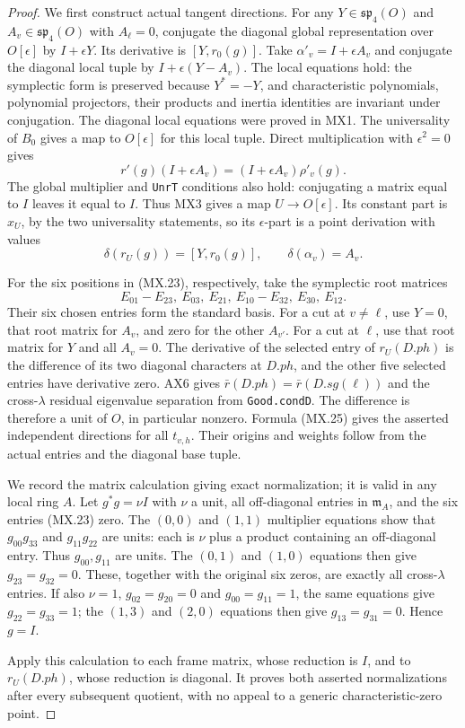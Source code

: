 \begin{proof}
We first construct actual tangent directions.
For any $Y\in\mathfrak {sp}_4(O)$ and
$A_v\in\mathfrak {sp}_4(O)$ with $A_\ell=0$, conjugate
the diagonal global representation over $O[\epsilon]$
by $I+\epsilon Y$.  Its derivative is $[Y,r_0(g)]$.
Take $\alpha'_v=I+\epsilon A_v$ and conjugate the
diagonal local tuple by $I+\epsilon(Y-A_v)$.
The local equations hold: the symplectic form is preserved
because $Y^*=-Y$, and characteristic polynomials,
polynomial projectors, their products and inertia identities
are invariant under conjugation.  The diagonal local
equations were proved in MX1.
The universality of $B_0$ gives a map to $O[\epsilon]$
for this local tuple.  Direct multiplication with
$\epsilon^2=0$ gives
\[
 r'(g)(I+\epsilon A_v)
  =(I+\epsilon A_v)\rho'_v(g).
 \tag{MX.24}
\]
The global multiplier and \texttt{UnrT} conditions also
hold: conjugating a matrix equal to $I$ leaves it equal
to $I$.  Thus MX3 gives a map $U\to O[\epsilon]$.
Its constant part is $x_U$, by the two universality
statements, so its $\epsilon$-part is a point derivation
with values
\[
 \delta(r_U(g))=[Y,r_0(g)],\qquad
                         \delta(\alpha_v)=A_v.
 \tag{MX.25}
\]

For the six positions in (MX.23), respectively, take the
symplectic root matrices
\[
 E_{01}-E_{23},\ E_{03},\ E_{21},\
 E_{10}-E_{32},\ E_{30},\ E_{12}.
 \tag{MX.26}
\]
Their six chosen entries form the standard basis.
For a cut at $v\ne\ell$, use $Y=0$, that root matrix
for $A_v$, and zero for the other $A_{v'}$.
For a cut at $\ell$, use that root matrix for $Y$ and
all $A_v=0$.
The derivative of the selected entry of $r_U(D.ph)$ is
the difference of its two diagonal characters at $D.ph$,
and the other five selected entries have derivative zero.
AX6 gives $\bar r(D.ph)=\bar r(D.sg(\ell))$ and the
cross-$\lambda$ residual eigenvalue separation from
\texttt{Good.condD}.  The difference is therefore a unit
of $O$, in particular nonzero.  Formula (MX.25) gives
the asserted independent directions for all $t_{v,h}$.
Their origins and weights follow from the actual entries
and the diagonal base tuple.

We record the matrix calculation giving exact
normalization; it is valid in any local ring $A$.
Let $g^*g=\nu I$ with $\nu$ a unit, all off-diagonal
entries in $\mathfrak m_A$, and the six entries (MX.23)
zero.  The $(0,0)$ and $(1,1)$ multiplier equations show
that $g_{00}g_{33}$ and $g_{11}g_{22}$ are units: each
is $\nu$ plus a product containing an off-diagonal
entry.  Thus $g_{00},g_{11}$ are units.
The $(0,1)$ and $(1,0)$ equations then give
$g_{23}=g_{32}=0$.  These, together with the original
six zeros, are exactly all cross-$\lambda$ entries.
If also $\nu=1$, $g_{02}=g_{20}=0$ and
$g_{00}=g_{11}=1$, the same equations give
$g_{22}=g_{33}=1$; the $(1,3)$ and $(2,0)$ equations
then give $g_{13}=g_{31}=0$.  Hence $g=I$.

Apply this calculation to each frame matrix, whose
reduction is $I$, and to $r_U(D.ph)$, whose reduction
is diagonal.  It proves both asserted normalizations
after every subsequent quotient, with no appeal to a
generic characteristic-zero point.
\end{proof}

